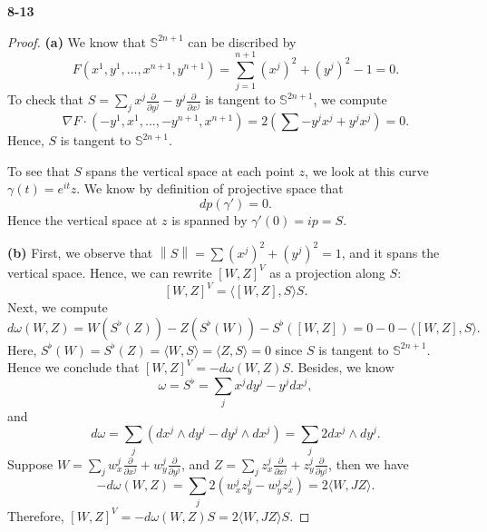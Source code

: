 \documentclass[11pt, a4paper]{article}
\theoremstyle{plain}
\theoremstyle{definition}
\theoremstyle{remark}
\begin{document}
{
\newcommand{\pp}[1]{\frac{\partial}{\partial #1}}
\newcommand{\mt}[1]{\langle #1\rangle}
\newcommand{\bs}{\mathbb{S}}
\newcommand{\nm}[1]{\left\|#1\right\|}
\newcommand{\Rm}[4]{\text{Rm}(#1, #2, #3, #4)}
\newcommand{\trm}[4]{\widetilde{\text{Rm}}(\tilde #1, \tilde #2, \tilde #3, \tilde #4)}
\newcommand{\tx}{\tilde x}
\newcommand{\ty}{\tilde y}
\newcommand{\tz}{\tilde z}
\newcommand{\tw}{\tilde w}
\newcommand{\aaa}[4]{\langle [\tilde#1,\tilde#2]^V,[\tilde#3,\tilde#4]^V\rangle}
\newcommand{\cp}{\mathbb{CP}^{n}}


\noindent\textbf{8-13}
\begin{proof}
    \textbf{(a)} We know that $\bs^{2n+1}$ can be discribed by 
    \[F(x^1,y^1,...,x^{n+1},y^{n+1}) = \sum_{j=1}^{n+1} (x^j)^2 + (y^j)^2 - 1 = 0.\]
    To check that $S = \sum_j x^j\pp{y^j} - y^j\pp{x^j}$ is tangent to $\bs^{2n+1}$, we compute
    \[\nabla F \cdot (-y^1,x^1,...,-y^{n+1},x^{n+1}) = 2(\sum -y^jx^j + y^jx^j) = 0.\]
    Hence, $S$ is tangent to $\bs^{2n+1}$. 

    To see that $S$ spans the vertical space at each point $z$, we look at this curve $\gamma(t) = e^{it}z$. We know by definition of projective space that
    \[dp(\gamma') = 0.\]
    Hence the vertical space at $z$ is spanned by $\gamma'(0) = ip = S.$

    \textbf{(b)} First, we observe that $\nm{S} = \sum (x^j)^2 + (y^j)^2 = 1$, and it spans the vertical space. Hence, we can rewrite $[W,Z]^V$ as a projection along $S$:
    \[[W,Z]^V = \mt{[W,Z],S}S.\]
\newcommand{\w}{\omega}
    Next, we compute
    \[d\w(W,Z) = W(S^\flat(Z)) - Z(S^\flat(W)) - S^\flat([W,Z]) = 0 - 0 - \mt{[W,Z],S}.\]
    Here, $S^\flat(W) = S^\flat(Z) = \mt{W,S} = \mt{Z,S} = 0$ since $S$ is tangent to $\bs^{2n+1}$. Hence we conclude that $[W,Z]^V = -d\w(W,Z)S$. Besides, we know 
    \[\w = S^\flat = \sum_j x^jdy^j - y^jdx^j,\]
    and
    \[d\w = \sum_j (dx^j \wedge dy^j - dy^j \wedge dx^j) = \sum_j 2dx^j \wedge dy^j.\]
    Suppose $W = \sum_j w_x^j\pp{x^j} + w_y^j\pp{y^j}$, and $Z = \sum_j z_x^j\pp{x^j} + z_y^j\pp{y^j}$, then we have
    \[-d\w(W,Z) = \sum_j 2(w_x^j z_y^j - w_y^j z_x^j) = 2\mt{W,JZ}.\]
    Therefore, $[W,Z]^V = -d\w(W,Z)S = 2\mt{W,JZ}S$.
\newcommand{\bbb}[4]{\mt{#1,J#2}\mt{#3,J#4}}
\newcommand{\II}{\mathrm{I\!I}}
\newcommand{\ccc}[4]{h(#1,#2)h(#3,#4)}


\end{proof}}
\end{document}
